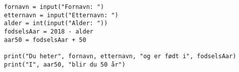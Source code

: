 %
%
\begin {lstlisting}
fornavn = input("Fornavn: ")
etternavn = input("Etternavn: ")
alder = int(input("Alder: "))
fodselsAar = 2018 - alder
aar50 = fodselsAar + 50

print("Du heter", fornavn, etternavn, "og er født i", fodselsAar)
print("I", aar50, "blir du 50 år")
\end{lstlisting}
